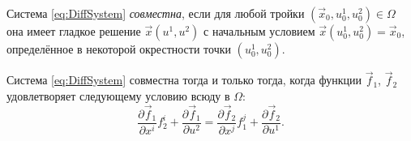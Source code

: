 \begin{definition}
	Система \eqref{eq:DiffSystem} \textit{совместна}, если для любой тройки $(\vec{x}_0, u^1_0, u^2_0) \in \Omega$ она имеет гладкое решение $\vec{x}(u^1, u^2)$ с начальным условием $\vec{x}(u^1_0, u^2_0) = \vec{x}_0$, определённое в некоторой окрестности точки $(u^1_0, u^2_0)$.
\end{definition}

\begin{theorem}[Дарбу] \label{theorem:Darboux}
	Система \eqref{eq:DiffSystem} совместна тогда и только тогда, когда функции $\vec{f}_1$, $\vec{f}_2$ удовлетворяет следующему условию всюду в $\Omega$:
	\begin{equation} \label{eq:Darboux}
		\frac{\partial \vec{f}_1}{\partial x^i}f^i_2 + \frac{\partial\vec{f}_1}{\partial u^2} = \frac{\partial\vec{f}_2}{\partial x^j}f^j_1 + \frac{\partial\vec{f}_2}{\partial u^1}.
	\end{equation}
\end{theorem}

